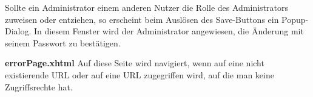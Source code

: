 Sollte ein Administrator einem anderen Nutzer die Rolle des Administrators zuweisen oder entziehen, so erscheint beim Auslösen des Save-Buttons ein Popup-Dialog.
In diesem Fenster wird der Administrator angewiesen, die Änderung mit seinem Passwort zu bestätigen.


\begin{samepage}
    \textbf{errorPage.xhtml} Auf diese Seite wird navigiert, wenn auf eine nicht existierende URL oder auf eine URL zugegriffen wird, auf die man keine Zugriffsrechte hat.
    \nopagebreak

\end{samepage}


